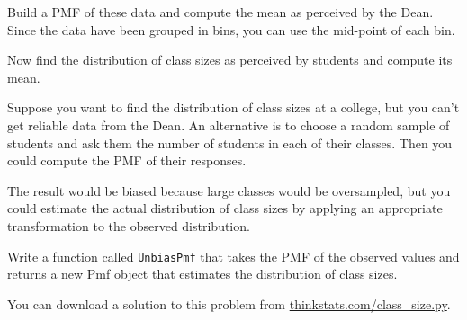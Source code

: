 \documentclass[12pt]{book}
\begin{document}
\begin{exercise}
Build a PMF of these data and compute the mean as perceived by the
Dean.  Since the data have been grouped in bins, you can use the
mid-point of each bin.


Now find the distribution of class sizes as perceived by students
and compute its mean.  

Suppose you want to find the distribution of class sizes at a
college, but you can't get reliable data from the Dean.
An alternative is to choose a random sample of students and ask them
the number of students in each of their classes.  Then you could compute
the PMF of their responses.


The result would be biased because large classes
would be oversampled, but you could estimate the actual
distribution of class sizes by applying an appropriate transformation
to the observed distribution.

Write a function called \verb"UnbiasPmf" that takes the PMF of the
observed values and returns a new Pmf object that estimates the
distribution of class sizes.

You can download a solution to this problem from
\url{thinkstats.com/class_size.py}.


\end{exercise}
\end{document}
